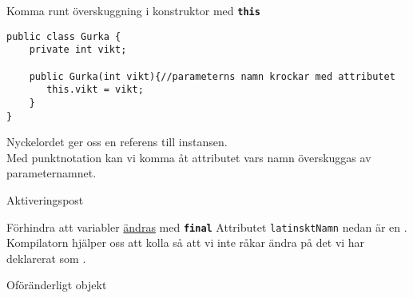 \documentclass{lecturenotes}
\begin{document}
\begin{Slide}{Komma runt överskuggning i konstruktor med \texttt{\textbf{this}}}
\begin{lstlisting}[]
public class Gurka {
    private int vikt;  

    public Gurka(int vikt){//parameterns namn krockar med attributet
       this.vikt = vikt;
    } 
}
\end{lstlisting}
Nyckelordet  ger oss en referens till instansen. \\
Med punktnotation kan vi komma åt attributet vars namn överskuggas av parameternamnet.
\end{Slide}

\begin{Slide}{Aktiveringspost}
\end{Slide}

\begin{Slide}{Förhindra att variabler \href{https://docs.oracle.com/javase/tutorial/essential/concurrency/immutable.html}{ändras} med \texttt{\textbf{final}}}
Attributet \texttt{latinsktNamn} nedan är en .\\ Kompilatorn hjälper oss att kolla så att vi inte råkar ändra på det vi har deklarerat som .

\end{Slide}

\begin{Slide}{Oföränderligt objekt}

\end{Slide}
\end{document}
